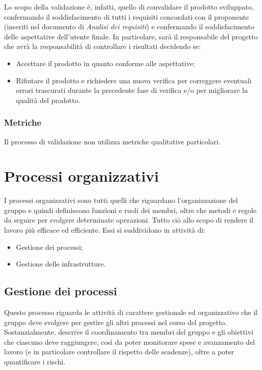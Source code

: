 Lo scopo della validazione è, infatti, quello di convalidare il prodotto sviluppato, confermando il soddisfacimento di tutti i requisiti concordati con il proponente (inseriti nel documento di \textit{Analisi dei requisiti})
e confermando il soddisfacimento delle aspettative dell'utente finale.
In particolare, sarà il responsabile del progetto che avrà la responsabilità di controllare i risultati decidendo se:
\begin{itemize}
    \item Accettare il prodotto in quanto conforme alle aspettative;
    \item Rifiutare il prodotto e richiedere una nuova verifica per correggere eventuali errori trascurati durante la precedente fase di verifica e/o per migliorare la qualità del prodotto.
\end{itemize}

\subsubsection{Metriche}\label{sec:processi_di_supporto:validazione:metriche}
Il processo di validazione non utilizza metriche qualitative particolari.

\newpage
\section{Processi organizzativi}\label{sec:processi_organizzativi}
I processi organizzativi sono tutti quelli che riguardano l’organizzazione del gruppo e quindi definiscono funzioni e ruoli dei membri, oltre che metodi e regole da seguire per svolgere determinate operazioni.
Tutto ciò allo scopo di rendere il lavoro più efficace ed efficiente.
Essi si suddividono in attività di:
\begin{itemize}
    \item Gestione dei processi;
    \item Gestione delle infrastrutture.
\end{itemize}


\subsection{Gestione dei processi}\label{sec:processi_organizzativi:gestione_processi}
Questo processo riguarda le attività di carattere gestionale ed organizzativo che il gruppo deve svolgere per gestire gli altri processi nel corso del progetto. Sostanzialmente, descrive il coordinamento tra membri del gruppo e gli obiettivi che ciascuno deve raggiungere, così da poter monitorare spese e avanzamento del lavoro (e in particolare controllare il rispetto delle scadenze), oltre a poter quantificare i rischi.

